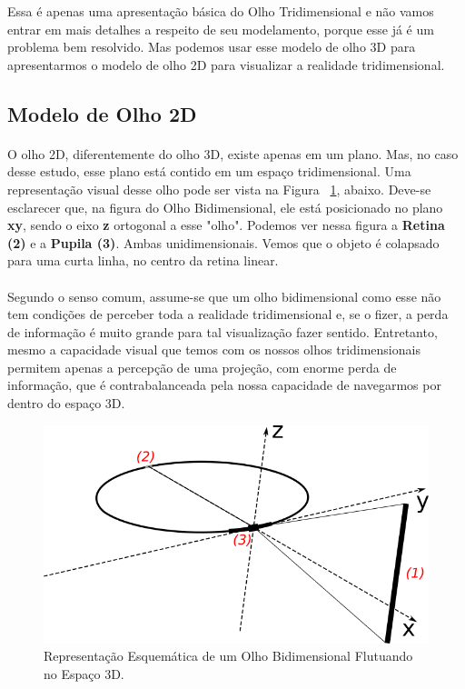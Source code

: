 \documentclass{article}
\begin{document}
	Essa é apenas uma apresentação básica do Olho Tridimensional e não vamos entrar em mais detalhes a respeito de seu modelamento, porque esse já é um problema bem resolvido. Mas podemos usar esse modelo de olho 3D para apresentarmos o modelo de olho 2D para visualizar a realidade tridimensional.
	 
	\subsection{Modelo de Olho 2D} \label{mo2d}
	
	\paragraph{}
	O olho 2D, diferentemente do olho 3D, existe apenas em um plano. Mas, no caso desse estudo, esse plano está contido em um espaço tridimensional. Uma representação visual desse olho pode ser vista na Figura ~\ref{fig:Olho2D}, abaixo. Deve-se esclarecer que, na figura do Olho Bidimensional, ele está posicionado no plano \textbf{xy}, sendo o eixo \textbf{z} ortogonal a esse "olho". Podemos ver nessa figura a \textbf{Retina (2)} e a \textbf{Pupila (3)}. Ambas unidimensionais. Vemos que o objeto é colapsado para uma curta linha, no centro da retina linear.
	
	\paragraph{}
	Segundo o senso comum, assume-se que um olho bidimensional como esse não tem condições de perceber toda a realidade tridimensional e, se o fizer, a perda de informação é muito grande para tal visualização fazer sentido. Entretanto, mesmo a capacidade visual que temos com os nossos olhos tridimensionais permitem apenas a percepção de uma projeção, com enorme perda de informação, que é contrabalanceada pela nossa capacidade de navegarmos por dentro do espaço 3D.
	
	\begin{figure}[h]
		\centering
		\includegraphics[scale=0.7]{Olho-Bidimensional}
		\caption{Representação Esquemática de um Olho Bidimensional Flutuando no Espaço 3D.}
		\label{fig:Olho2D}
	\end{figure}
	
\end{document}
